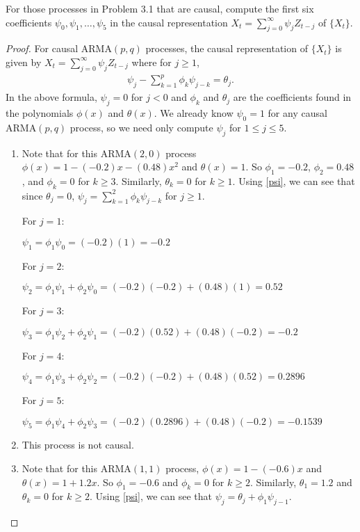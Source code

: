 \documentclass[12pt]{article}
\theoremstyle{definition}
\newenvironment{custompbm}[1]
  {\renewcommand\theproblem{#1}\problem}
  {\endproblem}
\begin{document}
\begin{custompbm}{3.3}
  For those processes in Problem 3.1 that are causal, compute the first six
  coefficients $\psi_0, \psi_1, \dots, \psi_5$ in the causal representation
  $X_t = \sum_{j=0}^\infty \psi_j Z_{t-j}$ of $\{X_t\}$.
\end{custompbm}

\begin{proof}
  For causal ARMA$(p ,q)$ processes, the causal representation of $\{ X_t\}$ is
  given by $X_t = \sum_{j=0}^\infty \psi_j Z_{t-j}$ where for $j \geq 1$,
  \begin{align}\label{psi}
    \psi_j - \sum_{k=1}^p \phi_k \psi_{j-k} = \theta_j.
  \end{align}
  In the above formula, $\psi_{j} = 0$ for $j < 0$ and $\phi_k$ and $\theta_j$ are the coefficients found in the
  polynomials $\phi(x)$ and $\theta(x)$. We already know $\psi_0 = 1$ for
  any causal ARMA$(p, q)$ process, so we need only compute $\psi_j$ for $1\leq j\leq 5$.
  \begin{enumerate}
    \item Note that for this ARMA$(2, 0)$ process $\phi(x) = 1 - (-0.2)x - (0.48)x^2$ and
      $\theta(x) = 1$. So $\phi_1 = -0.2$, $\phi_2 = 0.48$, and $\phi_k = 0$ for $k\geq 3$. Similarly,
      $\theta_k = 0$ for $k\geq 1$. Using \eqref{psi}, we can see that
      since $\theta_j = 0$, $\psi_j = \sum_{k=1}^2 \phi_k \psi_{j-k}$ for $j\geq 1$.

      For $j=1$:

      $\psi_1 = \phi_1 \psi_0 = (-0.2)(1) = -0.2$

      For $j=2$:

      $\psi_2 = \phi_1\psi_1 + \phi_2\psi_0 = (-0.2)(-0.2) + (0.48)(1) = 0.52$

      For $j=3$:

      $\psi_3 = \phi_1\psi_2 + \phi_2\psi_1 = (-0.2)(0.52) + (0.48)(-0.2) = -0.2$

      For $j=4$:

      $\psi_4 = \phi_1\psi_3 + \phi_2\psi_2 = (-0.2)(-0.2) + (0.48)(0.52) = 0.2896$

      For $j=5$:

      $\psi_5 = \phi_1\psi_4 + \phi_2\psi_3 = (-0.2)(0.2896) + (0.48)(-0.2) = -0.1539$
    \item This process is not causal.
    \item Note that for this ARMA$(1,1)$ process, $\phi(x) = 1 - (-0.6)x$ and
      $\theta(x) = 1 + 1.2x$. So $\phi_1 = -0.6$ and $\phi_k = 0$ for $k\geq 2$. Similarly,
      $\theta_1 = 1.2$ and $\theta_k = 0$ for $k\geq 2$. Using \eqref{psi}, we can
      see that $\psi_j = \theta_j +  \phi_1 \psi_{j-1}$.


\end{enumerate}
\end{proof}
\end{document}
